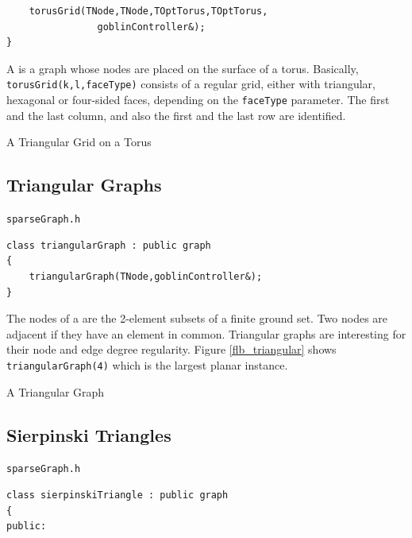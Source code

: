 \documentclass[a4paper,11pt,twoside]{book}
\begin{document}
\begin{multicols}{2}
\begin{mymethods}
\begin{verbatim}
    torusGrid(TNode,TNode,TOptTorus,TOptTorus,
                goblinController&);
}
\end{verbatim}
\end{mymethods}
A  is a graph whose nodes are placed on the surface of a torus.
Basically, \verb/torusGrid(k,l,faceType)/ consists of a regular grid, either
with triangular, hexagonal or four-sided faces, depending on the \verb/faceType/
parameter. The first and the last column, and also the first and the last row
are identified.

\bigskip
\begin{figurehere}
\begin{center}
\epsfxsize=8cm
\vspace{0.5cm}
\caption{\label{flb_torus_grid}A Triangular Grid on a Torus}
\end{center}
\end{figurehere}


\subsection{Triangular Graphs}
\myinclude\verb/sparseGraph.h/
\begin{mymethods}
\begin{verbatim}
class triangularGraph : public graph
{
    triangularGraph(TNode,goblinController&);
}
\end{verbatim}
\end{mymethods}
The nodes of a  are the 2-element subsets of a finite
ground set. Two nodes are adjacent if they have an element in common.
Triangular graphs are interesting for their node and edge degree regularity.
Figure \ref{flb_triangular} shows \verb/triangularGraph(4)/ which is the
largest planar instance.

\bigskip
\begin{figurehere}
\begin{center}
\epsfxsize=7cm
\vspace{0.5cm}
\caption{\label{flb_triangular}A Triangular Graph}
\end{center}
\end{figurehere}


\subsection{Sierpinski Triangles}
\myinclude\verb/sparseGraph.h/
\begin{mymethods}
\begin{verbatim}
class sierpinskiTriangle : public graph
{
public:


\end{verbatim}
\end{mymethods}
\end{multicols}
\end{document}

